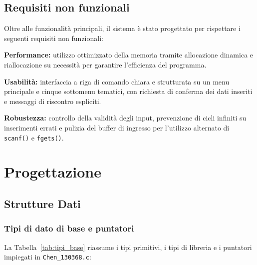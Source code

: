 \documentclass[11pt,a4paper,oneside,openany]{book}
\newenvironment{listacomp}{%
    \small
    \begin{list}{\textendash}{%
        \setlength{\topsep}{2pt}%
        \setlength{\partopsep}{0pt}%
        \setlength{\itemsep}{1pt}%
        \setlength{\parsep}{0pt}%
        \setlength{\leftmargin}{1.2em}%
    }%
}{%
    \end{list}%
}
\begin{document}
\section{Requisiti non funzionali}
Oltre alle funzionalità principali, il sistema è stato progettato per rispettare i seguenti requisiti non funzionali:
\begin{listacomp}
    \item \textbf{Performance:} utilizzo ottimizzato della memoria tramite allocazione dinamica e riallocazione su necessità per garantire l'efficienza del programma.
    \item \textbf{Usabilità:} interfaccia a riga di comando chiara e strutturata su un menu principale e cinque sottomenu tematici, con richiesta di conferma dei dati inseriti e messaggi di riscontro espliciti.
    \item \textbf{Robustezza:} controllo della validità degli input, prevenzione di cicli infiniti su inserimenti errati e pulizia del buffer di ingresso per l'utilizzo alternato di \texttt{scanf()} e \texttt{fgets()}.
\end{listacomp}

\chapter{Progettazione}

\section{Strutture Dati}

\subsection{Tipi di dato di base e puntatori}
La Tabella~\ref{tab:tipi_base} riassume i tipi primitivi, i tipi di libreria e i puntatori impiegati in \texttt{Chen\_130368.c}:
\end{document}
